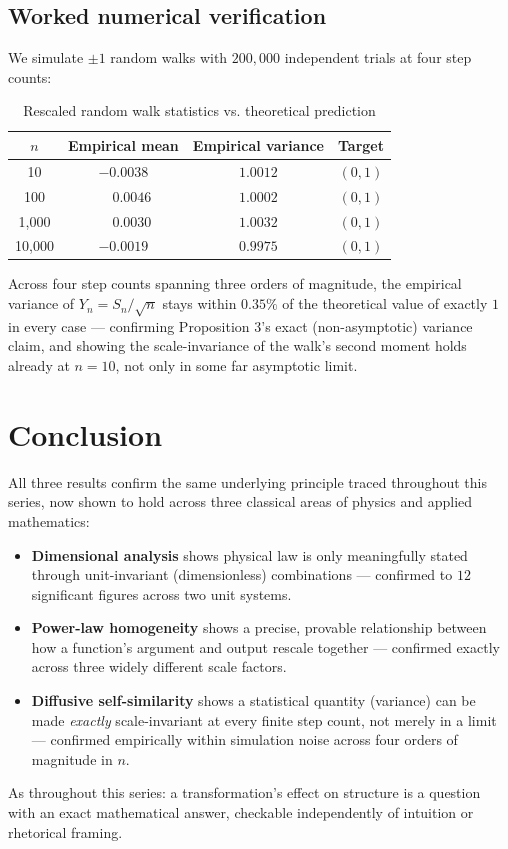 \documentclass[10pt,journal,compsoc]{IEEEtran}
\begin{document}
\subsection{Worked numerical verification}
We simulate $\pm1$ random walks with $200{,}000$ independent trials at four step counts:

\begin{table}[h]
\centering
\caption{Rescaled random walk statistics vs. theoretical prediction}
\begin{tabular}{cccc}
\toprule
$n$ & Empirical mean & Empirical variance & Target \\
\midrule
10     & $-0.0038$ & $1.0012$ & $(0,1)$ \\
100    & $\phantom{-}0.0046$ & $1.0002$ & $(0,1)$ \\
1{,}000  & $\phantom{-}0.0030$ & $1.0032$ & $(0,1)$ \\
10{,}000 & $-0.0019$ & $0.9975$ & $(0,1)$ \\
\bottomrule
\end{tabular}
\end{table}

Across four step counts spanning three orders of magnitude, the empirical variance of $Y_n=S_n/\sqrt n$ stays within $0.35\%$ of the theoretical value of exactly $1$ in every case — confirming Proposition 3's exact (non-asymptotic) variance claim, and showing the scale-invariance of the walk's second moment holds already at $n=10$, not only in some far asymptotic limit.

\section{Conclusion}
All three results confirm the same underlying principle traced throughout this series, now shown to hold across three classical areas of physics and applied mathematics:
\begin{itemize}
    \item \textbf{Dimensional analysis} shows physical law is only meaningfully stated through unit-invariant (dimensionless) combinations — confirmed to $12$ significant figures across two unit systems.
    \item \textbf{Power-law homogeneity} shows a precise, provable relationship between how a function's argument and output rescale together — confirmed exactly across three widely different scale factors.
    \item \textbf{Diffusive self-similarity} shows a statistical quantity (variance) can be made \emph{exactly} scale-invariant at every finite step count, not merely in a limit — confirmed empirically within simulation noise across four orders of magnitude in $n$.
\end{itemize}
As throughout this series: a transformation's effect on structure is a question with an exact mathematical answer, checkable independently of intuition or rhetorical framing.
\end{document}
